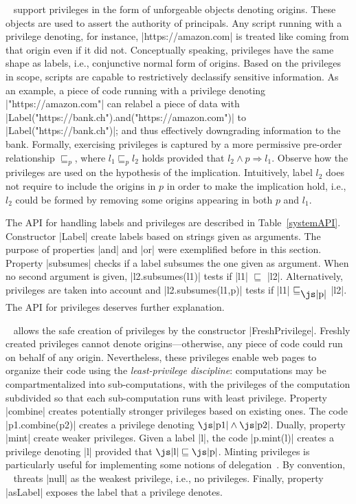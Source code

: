 \sys~ support privileges in the form of unforgeable objects denoting
origins. These objects are used to assert the authority of principals.  Any
script running with a privilege denoting, for instance, \js|https://amazon.com|
is treated like coming from that origin even if it did not.  Conceptually
speaking, privileges have the same shape as labels, i.e., conjunctive normal
form of origins.  Based on the privileges in scope, scripts are capable to
restrictively declassify sensitive information.  As an example, a piece of code
running with a privilege denoting \js|"https://amazon.com"| can relabel a piece
of data with \js|Label("https://bank.ch").and("https://amazon.com")| to
\js|Label("https://bank.ch")|; and thus effectively downgrading information to
the bank. Formally, exercising privileges is captured by a more permissive
pre-order relationship $\sqsubseteq_p$, where $l_1 \sqsubseteq_p l_2$ holds
provided that $l_2 \land p \Rightarrow l_1$. Observe how the privileges are used
on the hypothesis of the implication. Intuitively, label $l_2$ does not require to
include the origins in $p$ in order to make the implication hold, i.e., 
$l_2$ could be formed by removing some origins appearing in both $p$ and $l_1$.
 
The API for handling labels and privileges are described in
Table~\ref{systemAPI}. Constructor \js|Label| create labels based on strings
given as arguments. The purpose of properties \js|and| and \js|or| 
were exemplified before in this section.  Property \js|subsumes| checks if a
label subsumes the one given as argument. When no second argument is
given, \js|l2.subsumes(l1)| tests if \js|l1| $\sqsubseteq$
\js|l2|. Alternatively, privileges are taken into account and
\js|l2.subsumes(l1,p)| tests if \js|l1| $\sqsubseteq_{\mbox{\js|p|}}$ \js|l2|.
The API for privileges deserves further explanation.

\sys~ allows the safe creation of privileges by the constructor
\js|FreshPrivilege|. Freshly created privileges cannot denote
origins---otherwise, any piece of code could run on behalf of any origin.
Nevertheless, these privileges enable web pages to organize their code using the
\emph{least-privilege discipline}: computations may be compartmentalized into
sub-computations, with the privileges of the computation subdivided so that each
sub-computation runs with least privilege. Property \js|combine| creates
potentially stronger privileges based on existing ones. The code 
\js|p1.combine(p2)| creates a privilege denoting $\mbox{\js|p1|} \land
\mbox{\js|p2|}$.  Dually, property \js|mint| create weaker privileges. Given a
label \js|l|, the code \js|p.mint(l)| creates a privilege denoting \js|l| provided that
$\mbox{\js|l|} \sqsubseteq \mbox{\js|p|}$. Minting privileges is particularly
useful for implementing some notions of delegation~\cite{stefan:2011:dclabels}.  By convention,
\sys~ threats \js|null| as the weakest privilege, i.e., no privileges. Finally,
property \js|asLabel| exposes the label that a privilege denotes. 









